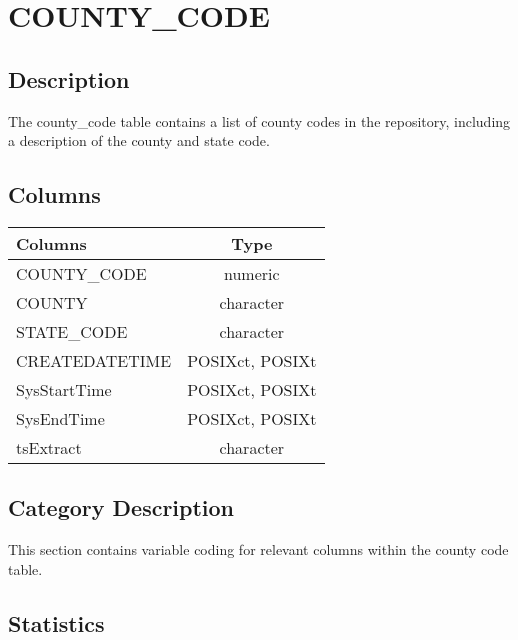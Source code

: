 \documentclass[
  letterpaper,
  DIV=11,
  numbers=noendperiod]{scrreprt}
\begin{document}
\hypertarget{county_code}{%
\chapter*{COUNTY\_CODE}\label{county_code}}

\hypertarget{description-6}{%
\section*{Description}\label{description-6}}

The county\_code table contains a list of county codes in the
repository, including a description of the county and state code.

\hypertarget{columns-6}{%
\section*{Columns}\label{columns-6}}

\begin{longtable}{lc}
\toprule
Columns & Type \\ 
\midrule
COUNTY\_CODE & numeric \\ 
COUNTY & character \\ 
STATE\_CODE & character \\ 
CREATEDATETIME & POSIXct, POSIXt \\ 
SysStartTime & POSIXct, POSIXt \\ 
SysEndTime & POSIXct, POSIXt \\ 
tsExtract & character \\ 
\bottomrule
\end{longtable}

\hypertarget{category-description-6}{%
\section*{Category Description}\label{category-description-6}}

This section contains variable coding for relevant columns within the
county code table.

\hypertarget{statistics-6}{%
\section*{Statistics}\label{statistics-6}}
\end{document}
